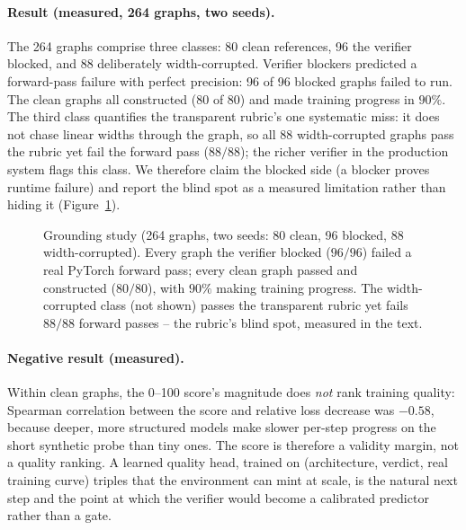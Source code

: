 \documentclass[11pt]{article}
\begin{document}
\paragraph{Result (measured, 264 graphs, two seeds).} The 264 graphs comprise three classes: 80 clean references, 96 the verifier blocked, and 88 deliberately width-corrupted. Verifier blockers predicted a forward-pass failure with perfect precision: 96 of 96 blocked graphs failed to run. The clean graphs all constructed (80 of 80) and made training progress in $90\%$. The third class quantifies the transparent rubric's one systematic miss: it does not chase linear widths through the graph, so all 88 width-corrupted graphs pass the rubric yet fail the forward pass ($88/88$); the richer verifier in the production system flags this class. We therefore claim the blocked side (a blocker proves runtime failure) and report the blind spot as a measured limitation rather than hiding it (Figure~\ref{fig:grounding}).

\begin{figure}[t]
\centering
{}
\caption{Grounding study (264 graphs, two seeds: 80 clean, 96 blocked, 88 width-corrupted). Every graph the verifier blocked ($96/96$) failed a real PyTorch forward pass; every clean graph passed and constructed ($80/80$), with $90\%$ making training progress. The width-corrupted class (not shown) passes the transparent rubric yet fails $88/88$ forward passes -- the rubric's blind spot, measured in the text.}
\label{fig:grounding}
\end{figure}

\paragraph{Negative result (measured).} Within clean graphs, the 0--100 score's magnitude does \emph{not} rank training quality: Spearman correlation between the score and relative loss decrease was $-0.58$, because deeper, more structured models make slower per-step progress on the short synthetic probe than tiny ones. The score is therefore a validity margin, not a quality ranking. A learned quality head, trained on (architecture, verdict, real training curve) triples that the environment can mint at scale, is the natural next step and the point at which the verifier would become a calibrated predictor rather than a gate.
\end{document}
